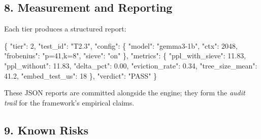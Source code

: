 \documentclass[
  11pt,
]{article}
\newenvironment{Shaded}{}{}
\newcommand{\DataTypeTok}[1]{\textcolor[rgb]{0.56,0.13,0.00}{#1}}
\newcommand{\DecValTok}[1]{\textcolor[rgb]{0.25,0.63,0.44}{#1}}
\newcommand{\FloatTok}[1]{\textcolor[rgb]{0.25,0.63,0.44}{#1}}
\newcommand{\FunctionTok}[1]{\textcolor[rgb]{0.02,0.16,0.49}{#1}}
\newcommand{\StringTok}[1]{\textcolor[rgb]{0.25,0.44,0.63}{#1}}
\begin{document}
\hypertarget{measurement-and-reporting}{%
\subsection{8. Measurement and
Reporting}\label{measurement-and-reporting}}

Each tier produces a structured report:

\begin{Shaded}
\begin{Highlighting}[]
\FunctionTok{\{}
  \DataTypeTok{"tier"}\FunctionTok{:} \DecValTok{2}\FunctionTok{,}
  \DataTypeTok{"test\_id"}\FunctionTok{:} \StringTok{"T2.3"}\FunctionTok{,}
  \DataTypeTok{"config"}\FunctionTok{:} \FunctionTok{\{}
    \DataTypeTok{"model"}\FunctionTok{:} \StringTok{"gemma3{-}1b"}\FunctionTok{,}
    \DataTypeTok{"ctx"}\FunctionTok{:} \DecValTok{2048}\FunctionTok{,}
    \DataTypeTok{"frobenius"}\FunctionTok{:} \StringTok{"p=41,k=8"}\FunctionTok{,}
    \DataTypeTok{"sieve"}\FunctionTok{:} \StringTok{"on"}
  \FunctionTok{\},}
  \DataTypeTok{"metrics"}\FunctionTok{:} \FunctionTok{\{}
    \DataTypeTok{"ppl\_with\_sieve"}\FunctionTok{:} \FloatTok{11.83}\FunctionTok{,}
    \DataTypeTok{"ppl\_without"}\FunctionTok{:}    \FloatTok{11.83}\FunctionTok{,}
    \DataTypeTok{"delta\_pct"}\FunctionTok{:}       \FloatTok{0.00}\FunctionTok{,}
    \DataTypeTok{"eviction\_rate"}\FunctionTok{:}   \FloatTok{0.34}\FunctionTok{,}
    \DataTypeTok{"tree\_size\_mean"}\FunctionTok{:}  \FloatTok{41.2}\FunctionTok{,}
    \DataTypeTok{"embed\_test\_us"}\FunctionTok{:}   \DecValTok{18}
  \FunctionTok{\},}
  \DataTypeTok{"verdict"}\FunctionTok{:} \StringTok{"PASS"}
\FunctionTok{\}}
\end{Highlighting}
\end{Shaded}

These JSON reports are committed alongside the engine; they form the
\emph{audit trail} for the framework's empirical claims.

\hypertarget{known-risks}{%
\subsection{9. Known Risks}\label{known-risks}}
\end{document}
